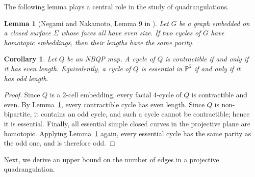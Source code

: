 \documentclass{article}
\newtheorem{corollary}[theorem]{Corollary}
\newtheorem{lemma}[theorem]{Lemma}
\begin{document}
The following lemma plays a central role in the study of quadrangulations.

\begin{lemma}[Negami and Nakamoto, Lemma 9 in \cite{NEG93}]\label{lem:cyclepar} Let $G$ be a graph embedded on a closed surface $\Sigma$ whose faces all have even size. If two cycles of $G$ have homotopic embeddings, then their lengths have the same parity.
\end{lemma}


\begin{corollary}\label{cor:nbqp-parity}
Let $Q$ be an NBQP map. A cycle of $Q$ is contractible if and only if it has even length. Equivalently, a cycle of $Q$ is essential in $\mathbb P^2$ if and only if it has odd length.
\end{corollary}
\begin{proof}
Since $Q$ is a 2-cell embedding, every facial $4$-cycle of $Q$ is contractible and even. By Lemma~\ref{lem:cyclepar}, every contractible cycle has even length. Since $Q$ is non-bipartite, it contains an odd cycle, and such a cycle cannot be contractible; hence it is essential. Finally, all essential simple closed curves in the projective plane are homotopic. Applying Lemma~\ref{lem:cyclepar} again, every essential cycle has the same parity as the odd one, and is therefore odd.
\end{proof}


Next, we derive an upper bound on the number of edges in a projective quadrangulation.
\end{document}
